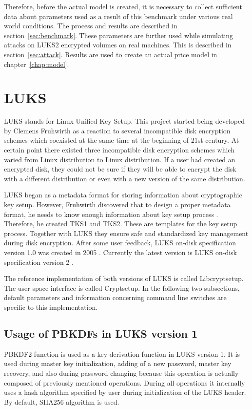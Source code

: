\documentclass[nolof,digital]{fithesis3}
\begin{document}
Therefore, before the actual model is created, it is necessary to collect sufficient data about parameters used as a result of this benchmark under various real world conditions. The process and results are described in section~\ref{sec:benchmark}. These parameters are further used while simulating attacks on LUKS2 encrypted volumes on real machines. This is described in section~\ref{sec:attack}. Results are used to create an actual price model in chapter~\ref{chap:model}.

\section{LUKS}
LUKS stands for Linux Unified Key Setup. This project started being developed by Clemens Fruhwirth as a reaction to several incompatible disk encryption schemes which coexisted at the same time at the beginning of 21st century. At certain point there existed three incompatible disk encryption schemes which varied from Linux distribution to Linux distribution. If a user had created an encrypted disk, they could not be sure if they will be able to encrypt the disk with a different distribution or even with a new version of the same distribution.

LUKS began as a metadata format for storing information about cryptographic key setup. However, Fruhwirth discovered that to design a proper metadata format, he needs to know enough information about key setup process \parencite{newmethods}. Therefore, he created TKS1 and TKS2. These are templates for the key setup process. Together with LUKS they ensure safe and standardized key management during disk encryption. After some user feedback, LUKS on-disk specification version 1.0 was created in 2005 \parencite{luks1}. Currently the latest version is LUKS on-disk specification version 2 \parencite{luks2}.

The reference implementation of both versions of LUKS is called Libcryptsetup. The user space interface is called Cryptsetup. In the following two subsections, default parameters and information concerning command line switches are specific to this implementation.

\subsection{Usage of PBKDFs in LUKS version 1}
\label{luks1}
PBKDF2 function is used as a key derivation function in LUKS version 1. It is used during master key initialization, adding of a new password, master key recovery, and also during password changing because this operation is actually composed of previously mentioned operations. During all operations it internally uses a hash algorithm specified by user during initialization of the LUKS header. By default, SHA256 algorithm is used.
\end{document}

